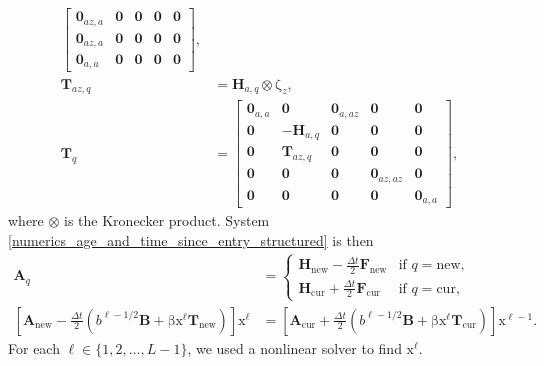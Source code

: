 \documentclass[USenglish]{article}
\renewcommand{\vec}[1]{\boldsymbol{\mathrm{#1}}}
\newcommand{\mat}[1]{\mathbf{#1}}
\begin{document}
\begin{subequations}
\begin{align}
\begin{bmatrix}
      \mat{0}_{az,a} & \mat{0} & \mat{0} & \mat{0} & \mat{0} \\
      \mat{0}_{az,a} & \mat{0} & \mat{0} & \mat{0} & \mat{0} \\
      \mat{0}_{a,a} & \mat{0} & \mat{0} & \mat{0} & \mat{0}
    \end{bmatrix},
    \\
    \mat{T}_{az,q} &=
    \mat{H}_{a, q} \otimes \vec{\zeta}_z,
    \\
    \mat{T}_q &=
    \begin{bmatrix}
      \mat{0}_{a,a} & \mat{0} & \mat{0}_{a,az} & \mat{0} & \mat{0} \\
      \mat{0} & - \mat{H}_{a, q} & \mat{0} & \mat{0} & \mat{0} \\
      \mat{0} & \mat{T}_{az, q} & \mat{0} & \mat{0} & \mat{0} \\
      \mat{0} & \mat{0} & \mat{0} & \mat{0}_{az,az} & \mat{0} \\
      \mat{0} & \mat{0} & \mat{0} & \mat{0} & \mat{0}_{a,a}
    \end{bmatrix},
  \end{align}
\end{subequations}
where $\otimes$ is the Kronecker product.
System \eqref{numerics_age_and_time_since_entry_structured} is then
\begin{subequations}
  \label{step_age_and_time_since_entry_structured}
  \begin{align}
    \mat{A}_q &=
    \begin{cases}
      \mat{H}_{\mathrm{new}} - \frac{\Delta t}{2} \mat{F}_{\mathrm{new}}
      & \text{if $q = \mathrm{new}$},
      \\
      \mat{H}_{\mathrm{cur}} + \frac{\Delta t}{2} \mat{F}_{\mathrm{cur}}
      & \text{if $q = \mathrm{cur}$},
    \end{cases}
    \\
    \left[
      \mat{A}_{\mathrm{new}}
      - \frac{\Delta t}{2} \left(
        b^{\ell - 1 / 2} \mat{B}
        + \vec{\beta} \vec{x}^{\ell} \mat{T}_{\mathrm{new}}
      \right)
    \right]
    \vec{x}^{\ell} &=
    \left[
      \mat{A}_{\mathrm{cur}}
      + \frac{\Delta t}{2} \left(
        b^{\ell - 1 / 2} \mat{B}
        + \vec{\beta} \vec{x}^{\ell} \mat{T}_{\mathrm{cur}}
      \right)
    \right]
    \vec{x}^{\ell - 1}.
  \end{align}
\end{subequations}
For each $\ell \in \{1, 2, \ldots, L - 1\}$, we used a nonlinear
solver to find $\vec{x}^{\ell}$.
\end{document}
